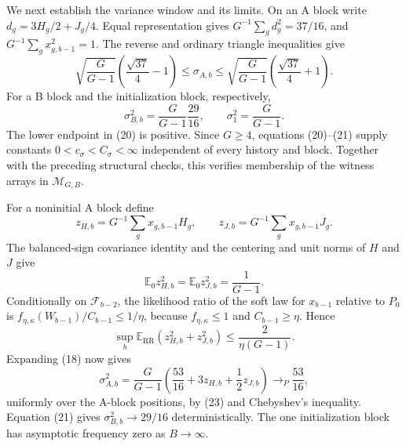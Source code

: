 We next establish the variance window and its limits.  On an A block write \(d_g=3H_g/2+J_g/4\).  Equal representation gives \(G^{-1}\sum_gd_g^2=37/16\), and \(G^{-1}\sum_gx_{g,b-1}^2=1\).  The reverse and ordinary triangle inequalities give
\[
\sqrt{\frac G{G-1}}\left(\frac{\sqrt{37}}4-1\right)
\leq\sigma_{A,b}
\leq\sqrt{\frac G{G-1}}\left(\frac{\sqrt{37}}4+1\right). \tag{20}
\]
For a B block and the initialization block, respectively,
\[
\sigma_{B,b}^2=\frac G{G-1}\frac{29}{16},
\qquad
\sigma_1^2=\frac G{G-1}.                                 \tag{21}
\]
The lower endpoint in (20) is positive.  Since \(G\geq4\), equations (20)--(21) supply constants \(0<c_\sigma<C_\sigma<\infty\) independent of every history and block.  Together with the preceding structural checks, this verifies membership of the witness arrays in \(\mathcal M_{G,B}\).

For a noninitial A block define
\[
z_{H,b}=G^{-1}\sum_gx_{g,b-1}H_g,
\qquad
z_{J,b}=G^{-1}\sum_gx_{g,b-1}J_g.
\]
The balanced-sign covariance identity and the centering and unit norms of \(H\) and \(J\) give
\[
\mathbb E_0z_{H,b}^2=\mathbb E_0z_{J,b}^2=\frac1{G-1}.    \tag{22}
\]
Conditionally on \(\mathcal F_{b-2}\), the likelihood ratio of the soft law for \(x_{b-1}\) relative to \(P_0\) is \(f_{\eta,\kappa}(W_{b-1})/C_{b-1}\leq1/\eta\), because \(f_{\eta,\kappa}\leq1\) and \(C_{b-1}\geq\eta\).  Hence
\[
\sup_b\mathbb E_{\mathrm{RR}}(z_{H,b}^2+z_{J,b}^2)
\leq\frac2{\eta(G-1)}.                                   \tag{23}
\]
Expanding (18) now gives
\[
\sigma_{A,b}^2
=\frac G{G-1}\left(\frac{53}{16}+3z_{H,b}+\frac12z_{J,b}\right)
\longrightarrow_P\frac{53}{16},                          \tag{24}
\]
uniformly over the A-block positions, by (23) and Chebyshev's inequality.  Equation (21) gives \(\sigma_{B,b}^2\to29/16\) deterministically.  The one initialization block has asymptotic frequency zero as \(B\to\infty\).

